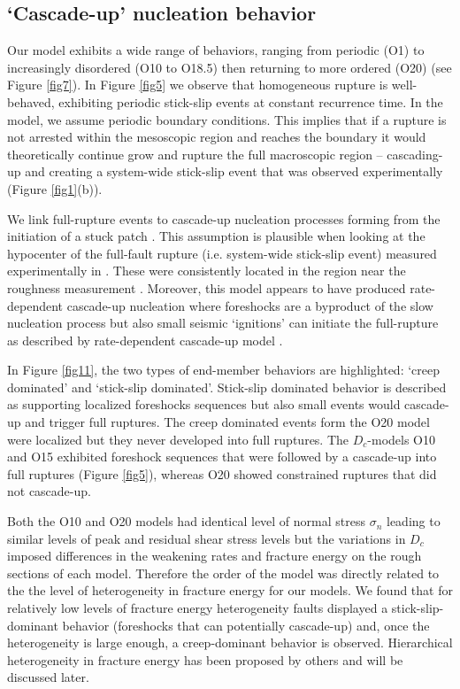 \documentclass[preprint,1p, 10pt,authoryear]{elsarticle}
\begin{document}
\subsection{`Cascade-up' nucleation behavior}
\label{Cascade_UP}
Our model exhibits a wide range of behaviors, ranging from periodic (O1) to increasingly disordered (O10 to O18.5) then returning to more ordered (O20) (see Figure \ref{fig7}). In Figure \ref{fig5} we observe that homogeneous rupture is well-behaved, exhibiting periodic stick-slip events at constant recurrence time.  In the model, we assume periodic boundary conditions. This implies that if a rupture is not arrested within the mesoscopic region and reaches the boundary it would theoretically continue grow and rupture the full macroscopic region -- cascading-up and creating a system-wide stick-slip event that was observed experimentally (Figure \ref{fig1}(b)). 

We link full-rupture events to cascade-up nucleation processes forming from the initiation of a stuck patch \citep{Noda2013, Selvadurai2017,McLaskey2019}. This assumption is plausible when looking at the hypocenter of the full-fault rupture (i.e. system-wide stick-slip event) measured experimentally in \citet{Selvadurai2015}. These were consistently located in the region near the roughness measurement \citep[magenta star in Fig. 7 and 8 in ][]{Selvadurai2015}. Moreover, this model appears to have produced rate-dependent cascade-up nucleation where foreshocks are a byproduct of the slow nucleation process but also small seismic `ignitions' can initiate the full-rupture as described by rate-dependent cascade-up model \citep{Noda2013, McLaskey2019}.

In Figure \ref{fig11}, the two types of end-member behaviors are highlighted: `creep dominated' and `stick-slip dominated'. Stick-slip dominated behavior is described as supporting localized foreshocks sequences but also small events would cascade-up and trigger full ruptures. The creep dominated events form the O20 model were localized but they never developed into full ruptures. The $D_{c}$-models O10 and O15 exhibited foreshock sequences that were followed by a cascade-up into full ruptures (Figure \ref{fig5}), whereas O20 showed constrained ruptures that did not cascade-up. 

Both the O10 and O20 models had identical level of normal stress $\sigma_{n}$ leading to similar levels of peak and residual shear stress levels but the variations in $D_{c}$ imposed differences in the weakening rates and fracture energy on the rough sections of each model. Therefore the order of the model was directly related to the the level of heterogeneity in fracture energy for our models. We found that for relatively low levels of fracture energy heterogeneity faults displayed a stick-slip-dominant behavior (foreshocks that can potentially cascade-up) and, once the heterogeneity is large enough, a creep-dominant behavior is observed. Hierarchical heterogeneity in fracture energy has been proposed by others \citep{Ide2005, Aochi2014, Aochi2017} and will be discussed later.
\end{document}
